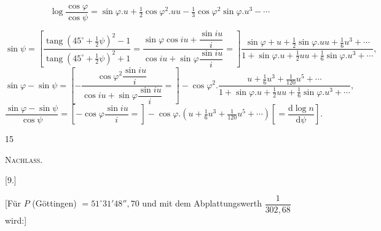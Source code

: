 \[
\log\frac{\cos\varphi}{\cos\psi}=\sin\varphi.u+\tfrac12\cos\varphi^2.uu-\tfrac13\cos\varphi^2\sin\varphi.u^3-\cdots
\]
\par\endgroup
[und]
\begingroup\footnotesize
\[
\sin\psi=\left[\frac{\operatorname{tang}(45^\circ+\frac12\psi)^2-1}{\operatorname{tang}(45^\circ+\frac12\psi)^2+1}=\frac{\sin\varphi\cos iu+\dfrac{\sin iu}{i}}{\cos iu+\sin\varphi\dfrac{\sin iu}{i}}=\right]
\frac{\sin\varphi+u+\frac12\sin\varphi.uu+\frac16u^3+\cdots}{1+\sin\varphi.u+\frac12uu+\frac16\sin\varphi.u^3+\cdots},
\]
\[
\sin\varphi-\sin\psi=\left[-\frac{\cos\varphi^2\dfrac{\sin iu}{i}}{\cos iu+\sin\varphi\dfrac{\sin iu}{i}}=\right]-\cos\varphi^2.
\frac{u+\frac16u^3+\frac1{120}u^5+\cdots}{1+\sin\varphi.u+\frac12uu+\frac16\sin\varphi.u^3+\cdots},
\]
\[
\frac{\sin\varphi-\sin\psi}{\cos\psi}=\left[-\cos\varphi\frac{\sin iu}{i}=\right]-\cos\varphi.(u+\tfrac16u^3+\tfrac1{120}u^5+\cdots)\left[=\frac{\mathrm d\log n}{\mathrm d\psi}\right].
\]
\par\endgroup
\vfill{}\hfill15\hspace*{2cm}\par
\clearpage
{}\hfill\textsc{Nachlass.}\hfill\mbox{}\par\bigskip
\begin{center}[9.]\end{center}
[Für $P$ (Göttingen) $=51^\circ31'48''{,}70$ und mit dem Abplattungswerth $\dfrac1{302{,}68}$ wird:]
